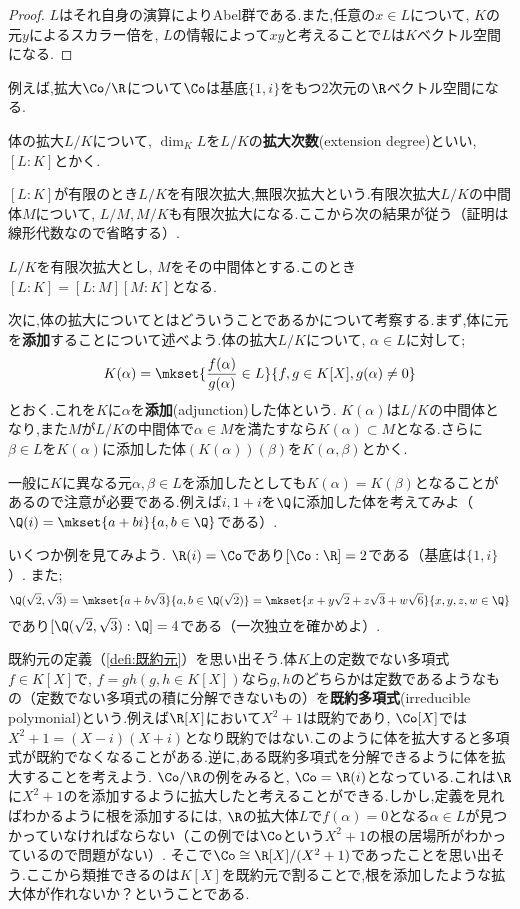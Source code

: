 \begin{proof}
	$L$はそれ自身の演算によりAbel群である.また,任意の$x\in L$について, $K$の元$y$によるスカラー倍を, $L$の情報によって$xy$と考えることで$L$は$K$ベクトル空間になる.
\end{proof}

例えば,拡大$\Co/\R$について$\Co$は基底$\{1,i\}$をもつ$2$次元の$\R$ベクトル空間になる.

\begin{defi}[拡大次数]
	体の拡大$L/K$について, $\dim_K L$を$L/K$の\textbf{拡大次数}(extension degree)といい, $[L:K]$とかく.
\end{defi}

$[L:K]$が有限のとき$L/K$を有限次拡大,無限次拡大という.有限次拡大$L/K$の中間体$M$について, $L/M,M/K$も有限次拡大になる.ここから次の結果が従う（証明は線形代数なので省略する）.

\begin{prop}
	$L/K$を有限次拡大とし, $M$をその中間体とする.このとき$[L:K]=[L:M][M:K]$となる.
\end{prop}

次に,体の拡大についてとはどういうことであるかについて考察する.まず,体に元を\textbf{添加}することについて述べよう.体の拡大$L/K$について, $\alpha\in L$に対して;
\[K(\alpha)=\mkset{\frac{f(\alpha)}{g(\alpha)}\in L}{f,g\in K[X],g(\alpha)\neq0}\]
とおく.これを$K$に$\alpha$を\textbf{添加}(adjunction)した体という. $K(\alpha)$は$L/K$の中間体となり,また$M$が$L/K$の中間体で$\alpha\in M$を満たすなら$K(\alpha)\subset M$となる.さらに$\beta\in L$を$K(\alpha)$に添加した体$(K(\alpha))(\beta)$を$K(\alpha,\beta)$とかく.

一般に$K$に異なる元$\alpha,\beta\in L$を添加したとしても$K(\alpha)=K(\beta)$となることがあるので注意が必要である.例えば$i,1+i$を$\Q$に添加した体を考えてみよ（$\Q(i)=\mkset{a+bi}{a,b\in\Q}$である）.

いくつか例を見てみよう. $\R(i)=\Co$であり$[\Co:\R]=2$である（基底は$\{1,i\}$）. また;
\[\Q(\sqrt{2},\sqrt{3})=\mkset{a+b\sqrt{3}}{a,b\in\Q(\sqrt{2})}=\mkset{x+y\sqrt{2}+z\sqrt{3}+w\sqrt{6}}{x,y,z,w\in\Q}\]
であり$[\Q(\sqrt{2},\sqrt{3}):\Q]=4$である（一次独立を確かめよ）.

既約元の定義（\ref{defi:既約元}）を思い出そう.体$K$上の定数でない多項式$f\in K[X]$で, $f=gh (g,h\in K[X])$なら$g,h$のどちらかは定数であるようなもの（定数でない多項式の積に分解できないもの）を\textbf{既約多項式}(irreducible polymonial)という.例えば$\R[X]$において$X^2+1$は既約であり, $\Co[X]$では$X^2+1=(X-i)(X+i)$となり既約ではない.このように体を拡大すると多項式が既約でなくなることがある.逆に,ある既約多項式を分解できるように体を拡大することを考えよう. $\Co/\R$の例をみると, $\Co=\R(i)$となっている.これは$\R$に$X^2+1$のを添加するように拡大したと考えることができる.しかし,定義を見ればわかるように根を添加するには, $\R$の拡大体$L$で$f(\alpha)=0$となる$\alpha\in L$が見つかっていなければならない（この例では$\Co$という$X^2+1$の根の居場所がわかっているので問題がない）.  そこで$\Co\cong\R[X]/(X^2+1)$であったことを思い出そう.ここから類推できるのは$K[X]$を既約元で割ることで,根を添加したような拡大体が作れないか？ということである.

